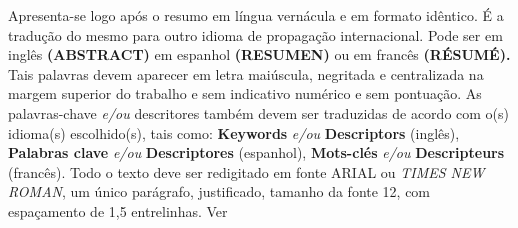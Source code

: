 Apresenta-se logo após o resumo em língua vernácula e em formato idêntico. É a tradução do mesmo para outro idioma de propagação internacional. Pode ser em inglês \textbf{(ABSTRACT)} em espanhol \textbf{(RESUMEN)} ou em francês \textbf{(RÉSUMÉ).} Tais palavras devem aparecer em letra maiúscula, negritada e centralizada na margem superior do trabalho e sem indicativo numérico e sem pontuação. As palavras-chave \textit{e/ou} descritores também devem ser traduzidas de acordo com o(s) idioma(s) escolhido(s), tais como: \textbf{Keywords} \textit{e/ou} \textbf{Descriptors} (inglês), \textbf{Palabras clave} \textit{e/ou} \textbf{Descriptores} (espanhol), \textbf{Mots-clés} \textit{e/ou} \textbf{Descripteurs} (francês). Todo o texto deve ser redigitado em fonte ARIAL ou \textit{TIMES NEW ROMAN}, um único parágrafo, justificado, tamanho da fonte 12, com espaçamento de 1,5 entrelinhas. Ver

